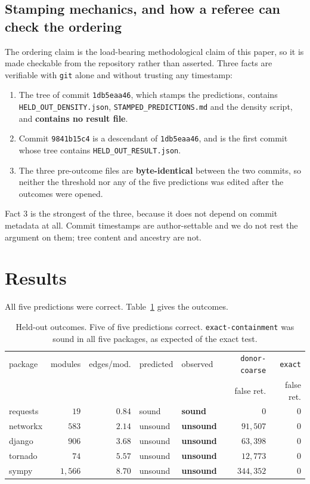 \documentclass[11pt]{article}
\begin{document}
\subsection{Stamping mechanics, and how a referee can check the ordering}
The ordering claim is the load-bearing methodological claim of this paper, so it is made checkable from the repository rather than asserted. Three facts are verifiable with \texttt{git} alone and without trusting any timestamp:

\begin{enumerate}
\item The tree of commit \texttt{1db5eaa46}, which stamps the predictions, contains \texttt{HELD_OUT_DENSITY.json}, \texttt{STAMPED_PREDICTIONS.md} and the density script, and \textbf{contains no result file}.
\item Commit \texttt{9841b15c4} is a descendant of \texttt{1db5eaa46}, and is the first commit whose tree contains \texttt{HELD_OUT_RESULT.json}.
\item The three pre-outcome files are \textbf{byte-identical} between the two commits, so neither the threshold nor any of the five predictions was edited after the outcomes were opened.
\end{enumerate}

Fact 3 is the strongest of the three, because it does not depend on commit metadata at all. Commit timestamps are author-settable and we do not rest the argument on them; tree content and ancestry are not.

\section{Results}
All five predictions were correct. Table~\ref{tab:res} gives the outcomes.

\begin{table}[h]
\centering
\begin{tabular}{lrrllrr}
\toprule
package & modules & edges/mod. & predicted & observed & \texttt{donor-coarse} & \texttt{exact} \\
 & & & & & false ret. & false ret. \\
\midrule
requests & $19$ & $0.84$ & sound & \textbf{sound} & $0$ & $0$ \\
networkx & $583$ & $2.14$ & unsound & \textbf{unsound} & $91{,}507$ & $0$ \\
django & $906$ & $3.68$ & unsound & \textbf{unsound} & $63{,}398$ & $0$ \\
tornado & $74$ & $5.57$ & unsound & \textbf{unsound} & $12{,}773$ & $0$ \\
sympy & $1{,}566$ & $8.70$ & unsound & \textbf{unsound} & $344{,}352$ & $0$ \\
\bottomrule
\end{tabular}
\caption{Held-out outcomes. Five of five predictions correct. \texttt{exact-containment} was sound in all five packages, as expected of the exact test.}
\label{tab:res}
\end{table}
\end{document}
